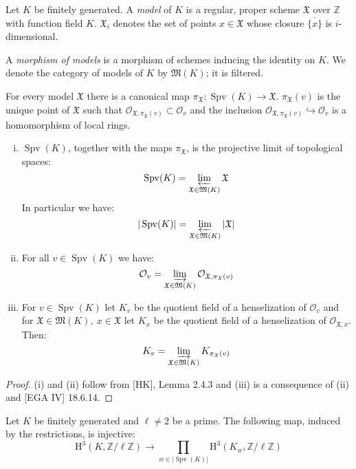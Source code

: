 \begin{definition}
Let $K$ be finitely generated. A \textit{model} of $K$ is a regular, proper scheme $\mathfrak{X}$ over $\mathbb{Z}$ with function field $K$. $\mathfrak{X}_i$ denotes the set of points $x\in\mathfrak{X}$ whose closure $\overline{\{x\}}$ is $i$-dimensional.

A \textit{morphism of models} is a morphism of schemes inducing the identity on $K$. We denote the category of models of $K$ by $\mathfrak{M}(K)$; it is filtered. 

For every model $\mathfrak{X}$ there is a canonical map $\pi_\mathfrak{X}:\operatorname{Spv}(K)\to\mathfrak{X}$. $\pi_\mathfrak{X}(v)$  is the unique point of $\mathfrak{X}$ such that $\mathcal{O}_{\mathfrak{X}, \pi_\mathfrak{X}(v)}\subset\mathcal{O}_v$ and the inclusion $\mathcal{O}_{\mathfrak{X}, \pi_\mathfrak{X}(v)}\hookrightarrow \mathcal{O}_v$ is a homomorphism of local rings.
\end{definition}

\begin{lemma}\label{2.3}
\begin{enumerate}[(i)]
\item $\operatorname{Spv}(K)$, together with the maps $\pi_{\mathfrak{X}}$, is the projective limit of topological spaces: 
\[\operatorname{Spv}(K) =\varprojlim_{\mathfrak{X}\in\mathfrak{M}(K)}\mathfrak{X}\]
In particular we have:
\[ |\operatorname{Spv}(K)| =\varprojlim_{\mathfrak{X}\in\mathfrak{M}(K)}|\mathfrak{X}| \]
\item For all $v\in\operatorname{Spv}(K)$ we have:
\[ \mathcal{O}_v = \varinjlim_{\mathfrak{X}\in\mathfrak{M}(K)}\mathcal{O}_{\mathfrak{X},\pi_\mathfrak{X}(v)} \]
\item For $v\in\operatorname{Spv}(K)$ let $K_v$ be the quotient field of a henselization of $\mathcal{O}_v$ and for $\mathfrak{X}\in\mathfrak{M}(K),\ x\in\mathfrak{X}$ let $K_x$ be the quotient field of a henselization of $\mathcal{O}_{\mathfrak{X},x}$. Then:
\[ K_v=\varinjlim_{\mathfrak{X}\in\mathfrak{M}(K)}K_{\pi_\mathfrak{X}(v)} \]
\end{enumerate}
\end{lemma}

\begin{proof}
(i) and (ii) follow from [HK], Lemma 2.4.3 and (iii) is a consequence of (ii) and [EGA IV] 18.6.14.
\end{proof}

\begin{lemma}\label{2.4-finitelygenerated}
Let $K$ be finitely generated and $\ell\neq 2$ be a prime. The following map, induced by the restrictions, is injective:
\[ \mathrm{H}^3(K,\mathbb{Z}/\ell\mathbb{Z})\to\prod_{w\in |\operatorname{Spv}(K)| }\mathrm{H}^3(K_w,\mathbb{Z}/\ell\mathbb{Z}) \]
\end{lemma}

